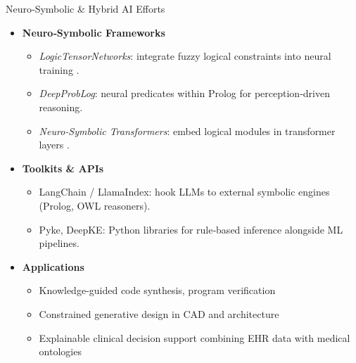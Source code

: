 \documentclass[german,10pt]{beamer}
\begin{document}
\begin{frame}{Neuro‑Symbolic \& Hybrid AI Efforts}
  \begin{itemize}
    \item \textbf{Neuro‑Symbolic Frameworks}
      \begin{itemize}
        \item \emph{LogicTensorNetworks}: integrate fuzzy logical constraints into neural training \cite{Garcez2009}.
        \item \emph{DeepProbLog}: neural predicates within Prolog for perception‑driven reasoning.
        \item \emph{Neuro‑Symbolic Transformers}: embed logical modules in transformer layers \cite{Xu2023}.
      \end{itemize}
    \item \textbf{Toolkits \& APIs}
      \begin{itemize}
        \item LangChain / LlamaIndex: hook LLMs to external symbolic engines (Prolog, OWL reasoners).
        \item Pyke, DeepKE: Python libraries for rule‑based inference alongside ML pipelines.
      \end{itemize}
    \item \textbf{Applications}
      \begin{itemize}
        \item Knowledge‑guided code synthesis, program verification  
        \item Constrained generative design in CAD and architecture  
        \item Explainable clinical decision support combining EHR data with medical ontologies
      \end{itemize}
  \end{itemize}
\end{frame}
\end{document}
